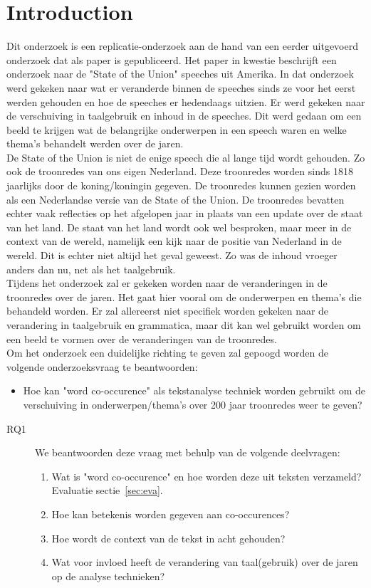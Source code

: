 \section{Introduction}
\label{sec:intro}

Dit onderzoek is een replicatie-onderzoek aan de hand van een eerder uitgevoerd onderzoek dat als paper is gepubliceerd. Het paper in kwestie beschrijft een onderzoek naar de "State of the Union" speeches uit Amerika. In dat onderzoek werd gekeken naar wat er veranderde binnen de speeches sinds ze voor het eerst werden gehouden en hoe de speeches er hedendaags uitzien. Er werd gekeken naar de verschuiving in taalgebruik en inhoud in de speeches. Dit werd gedaan om een beeld te krijgen wat de belangrijke onderwerpen in een speech waren en welke thema's behandelt werden over de jaren.
\\
De State of the Union is niet de enige speech die al lange tijd wordt gehouden. Zo ook de troonredes van ons eigen Nederland. Deze troonredes worden sinds 1818 jaarlijks door de koning/koningin gegeven. De troonredes kunnen gezien worden als een Nederlandse versie van de State of the Union. De troonredes bevatten echter vaak reflecties op het afgelopen jaar in plaats van een update over de staat van het land. De staat van het land wordt ook wel besproken, maar meer in de context van de wereld, namelijk een kijk naar de positie van Nederland in de wereld. Dit is echter niet altijd het geval geweest. Zo was de inhoud vroeger anders dan nu, net als het taalgebruik.
\\
Tijdens het onderzoek zal er gekeken worden naar de veranderingen in de troonredes over de jaren. Het gaat hier vooral om de onderwerpen en thema's die behandeld worden. Er zal allereerst niet specifiek worden gekeken naar de verandering in taalgebruik en grammatica, maar dit kan wel gebruikt worden om een beeld te vormen over de veranderingen van de troonredes.
\\
Om het onderzoek een duidelijke richting te geven zal gepoogd worden de volgende onderzoeksvraag te beantwoorden:

\begin{itemize}
\item Hoe kan "word co-occurence" als tekstanalyse techniek worden gebruikt om de verschuiving in onderwerpen/thema's over 200 jaar troonredes weer te geven?
\end{itemize}

\begin{description}
\item[RQ1]  We   beantwoorden deze vraag met behulp van de volgende deelvragen:
\begin{enumerate}
\item Wat is "word co-occurence" en hoe worden deze uit teksten verzameld? Evaluatie sectie~\ref{sec:eva}.
\item Hoe kan betekenis worden gegeven aan co-occurences?
\item Hoe wordt de context van de tekst in acht gehouden?
\item Wat voor invloed heeft de verandering van taal(gebruik) over de jaren op de analyse technieken?
\end{enumerate}
\end{description}

